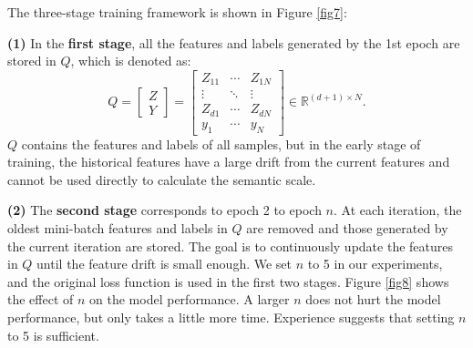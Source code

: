 \documentclass[10pt]{article} %
\begin{document}
The three-stage training framework is shown in Figure \ref{fig7}:

\textbf{(1)} In the \textbf{first stage}, all the features and labels generated by the 1st epoch are stored in $Q$, which is denoted as:
\[Q = \left[ {\begin{array}{*{20}{c}}
Z\\
Y
\end{array}} \right] = \left[ {\begin{array}{*{20}{c}}
{{Z_{11}}}& \cdots &{{Z_{1N}}}\\
 \vdots & \ddots & \vdots \\
{{Z_{d1}}}& \cdots &{{Z_{dN}}}\\
{{y_1}}& \cdots &{{y_N}}
\end{array}} \right] \in {\mathbb{R}^{\left( {d + 1} \right) \times N}}.\]
$Q$ contains the features and labels of all samples, but in the early stage of training, the historical features have a large drift from the current features and cannot be used directly to calculate the semantic scale.

\textbf{(2)} The \textbf{second stage} corresponds to epoch 2 to epoch $n$. At each iteration, the oldest mini-batch features and labels in $Q$ are removed and those generated by the current iteration are stored. The goal is to continuously update the features in $Q$ until the feature drift is small enough. We set $n$ to 5 in our experiments, and the original loss function is used in the first two stages. Figure \ref{fig8} shows the effect of $n$ on the model performance. A larger $n$ does not hurt the model performance, but only takes a little more time. Experience suggests that setting $n$ to 5 is sufficient. 
\end{document}
